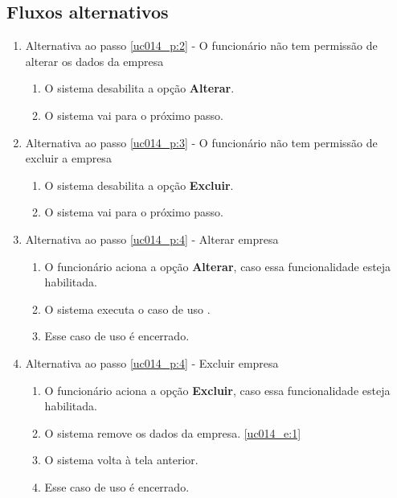\subsection{Fluxos alternativos}

\begin{enumerate}[label=A\arabic*]
	\item Alternativa ao passo \ref{uc014_p:2} - O funcionário não tem permissão de alterar os dados da empresa \label{uc014_a:1}
	\begin{enumerate}[label*=.\arabic*]
		\item O sistema desabilita a opção \textbf{Alterar}.
		\item O sistema vai para o próximo passo.
	\end{enumerate}
	
	\item Alternativa ao passo \ref{uc014_p:3} - O funcionário não tem permissão de excluir a empresa \label{uc014_a:2}
	\begin{enumerate}[label*=.\arabic*]
		\item O sistema desabilita a opção \textbf{Excluir}.
		\item O sistema vai para o próximo passo.
	\end{enumerate}
	
	\item Alternativa ao passo \ref{uc014_p:4} - Alterar empresa \label{uc014_a:3}
	\begin{enumerate}[label*=.\arabic*]
		\item O funcionário aciona a opção \textbf{Alterar}, caso essa funcionalidade esteja habilitada.
		\item O sistema executa o caso de uso .
		\item Esse caso de uso é encerrado.
	\end{enumerate}
	
	\item Alternativa ao passo \ref{uc014_p:4} - Excluir empresa \label{uc014_a:4}
	\begin{enumerate}[label*=.\arabic*]
		\item O funcionário aciona a opção \textbf{Excluir}, caso essa funcionalidade esteja habilitada.
		\item O sistema remove os dados da empresa. \label{uc014_a:4:2}\ref{uc014_e:1}
		\item O sistema volta à tela anterior.
		\item Esse caso de uso é encerrado.
	\end{enumerate}
\end{enumerate}

